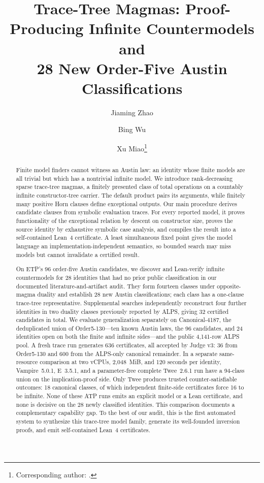 \documentclass[runningheads]{llncs}
\title{Trace-Tree Magmas: Proof-Producing Infinite Countermodels and\texorpdfstring{\\}{: }
28 New Order-Five Austin Classifications}
\author{Jiaming Zhao\inst{1,2} \and
  Bing Wu\inst{1} \and
  Xu Miao\inst{1}\thanks{Corresponding author: \email{miaoxu@zetyun.com}.}}
\institute{Yanbiao Lab, DataCanvas Co., Ltd., Beijing, China
  \and School of Mathematical Sciences, Peking University, Beijing, China}
\begin{document}
\maketitle

\begin{abstract}
Finite model finders cannot witness an Austin law: an identity whose finite
models are all trivial but which has a nontrivial infinite model.  We introduce
rank-decreasing sparse trace-tree magmas, a finitely presented class of total
operations on a countably infinite constructor-tree carrier.  The default
product pairs its arguments, while finitely many positive Horn clauses define
exceptional outputs.  Our main procedure derives candidate clauses from
symbolic evaluation traces.  For every reported model, it proves functionality
of the exceptional relation by descent on constructor size, proves the source
identity by exhaustive symbolic case analysis, and compiles the result into a
self-contained Lean~4 certificate.  A least simultaneous fixed point gives the
model language an implementation-independent semantics, so bounded search may
miss models but cannot invalidate a certified result.

On ETP's 96 order-five Austin candidates, we discover and Lean-verify infinite
countermodels for 28 identities that had no prior public classification in our
documented literature-and-artifact audit.  They form fourteen classes under
opposite-magma duality and establish 28 new Austin classifications; each class
has a one-clause trace-tree representative.  Supplemental
searches independently reconstruct four further identities in two duality
classes previously reported by ALPS, giving 32 certified candidates in total.
We evaluate generalization separately on Canonical-4187, the deduplicated union
of Order5-130---ten known Austin laws, the 96 candidates, and 24 identities open
on both the finite and infinite sides---and the public 4,141-row ALPS pool.  A
fresh trace run generates 636 certificates, all accepted by Judge v3: 36 from
Order5-130 and 600 from the ALPS-only canonical remainder.  In a separate
same-resource comparison at two vCPUs, 2,048~MiB, and 120 seconds per identity,
Vampire~5.0.1, E~3.5.1, and a parameter-free complete Twee~2.6.1 run have a
94-class union on the implication-proof side.  Only Twee produces trusted
counter-satisfiable outcomes: 18 canonical classes, of which independent
finite-side certificates force 16 to be infinite.  None of these ATP runs
emits an explicit model or a Lean certificate, and none is decisive on the 28
newly classified identities.  This comparison documents a complementary
capability gap.  To the best of our
audit, this is the first automated system to synthesize this trace-tree model
family, generate its well-founded inversion proofs, and emit self-contained
Lean~4 certificates.

\end{abstract}
\end{document}
